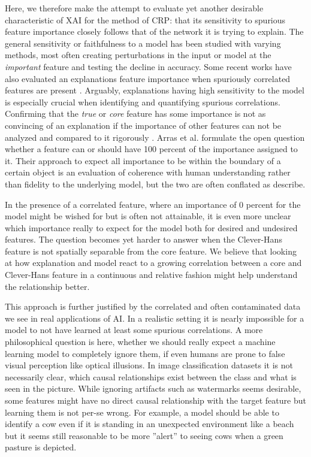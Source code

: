 Here, we therefore make the attempt to evaluate yet another desirable characteristic of XAI for the method of CRP: that its sensitivity to spurious feature importance closely follows that of the network it is trying to explain. The general sensitivity or faithfulness to a model has been studied with varying methods, most often creating perturbations in the input or model at the \textit{important} feature and testing the decline in accuracy. Some recent works have also evaluated an explanations feature importance when spuriously correlated features are present \cite{Yang2019,Kim2018,Parafita2019,Reimers2020,Singla2022}. Arguably, explanations having high sensitivity to the model is especially crucial when identifying and quantifying spurious correlations. Confirming that the \textit{true} or \textit{core} feature has some importance is not as convincing of an explanation if the importance of other features can not be analyzed and compared to it rigorously \cite{Singla2022}. Arras et al. \cite{Arras2022} formulate the open question whether a feature can or should have 100 percent of the importance assigned to it. Their approach to expect all importance to be within the boundary of a certain object is an evaluation of coherence with human understanding rather than fidelity to the underlying model, but the two are often conflated as \cite{Nauta2023} describe. 

In the presence of a correlated feature, where an importance of 0 percent for the model might be wished for but is often not attainable, it is even more unclear which importance really to expect for the model both for desired and undesired features. The question becomes yet harder to answer when the Clever-Hans feature is not spatially separable from the core feature.
We believe that looking at how explanation and model react to a growing correlation between a core and Clever-Hans feature in a continuous and relative fashion might help understand the relationship better. 

This approach is further justified by the correlated and often contaminated data we see in real applications of AI. 
In a realistic setting it is nearly impossible for a model to not have learned at least some spurious correlations. A more philosophical question is here, whether we should really expect a machine learning model to completely ignore them, if even humans are prone to false visual perception like optical illusions. In image classification datasets it is not necessarily clear, which causal relationships exist between the class and what is seen in the picture. While ignoring artifacts such as watermarks seems desirable, some features might have no direct causal relationship with the target feature but learning them is not per-se wrong. 
For example, a model should be able to identify a cow even if it is standing in an unexpected environment like a beach but it seems still reasonable to be more ''alert'' to seeing cows when a green pasture is depicted. 

